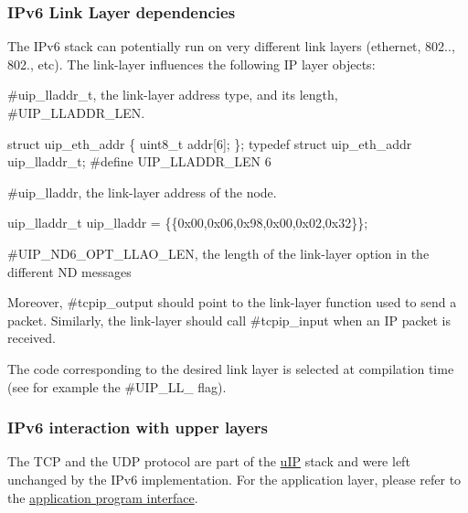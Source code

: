 \hypertarget{a00075_l2}{}\subsubsection{I\+Pv6 Link Layer dependencies}\label{a00075_l2}
The I\+Pv6 stack can potentially run on very different link layers (ethernet, 802.., 802., etc). The link-\/layer influences the following IP layer objects\+: \begin{DoxyItemize}
\item \#uip\+\_\+lladdr\+\_\+t, the link-\/layer address type, and its length, \#\+U\+I\+P\+\_\+\+L\+L\+A\+D\+D\+R\+\_\+\+L\+EN. 
\begin{DoxyCode}
\textcolor{keyword}{struct }uip\_eth\_addr \{
  uint8\_t addr[6];
\};
\textcolor{keyword}{typedef} \textcolor{keyword}{struct }uip\_eth\_addr uip\_lladdr\_t;
\textcolor{preprocessor}{#define UIP\_LLADDR\_LEN 6}
\end{DoxyCode}
 \item \#uip\+\_\+lladdr, the link-\/layer address of the node. 
\begin{DoxyCode}
uip\_lladdr\_t uip\_lladdr = \{\{0x00,0x06,0x98,0x00,0x02,0x32\}\};
\end{DoxyCode}
 \item \#\+U\+I\+P\+\_\+\+N\+D6\+\_\+\+O\+P\+T\+\_\+\+L\+L\+A\+O\+\_\+\+L\+EN, the length of the link-\/layer option in the different ND messages\end{DoxyItemize}
Moreover, \#tcpip\+\_\+output should point to the link-\/layer function used to send a packet. Similarly, the link-\/layer should call \#tcpip\+\_\+input when an IP packet is received.

The code corresponding to the desired link layer is selected at compilation time (see for example the \#\+U\+I\+P\+\_\+\+L\+L\+\_ flag).



\hypertarget{a00075_l45}{}\subsubsection{I\+Pv6 interaction with upper layers}\label{a00075_l45}
The T\+CP and the U\+DP protocol are part of the \hyperlink{a00074}{u\+IP} stack and were left unchanged by the I\+Pv6 implementation. For the application layer, please refer to the \hyperlink{a00074_api}{application program interface}.



